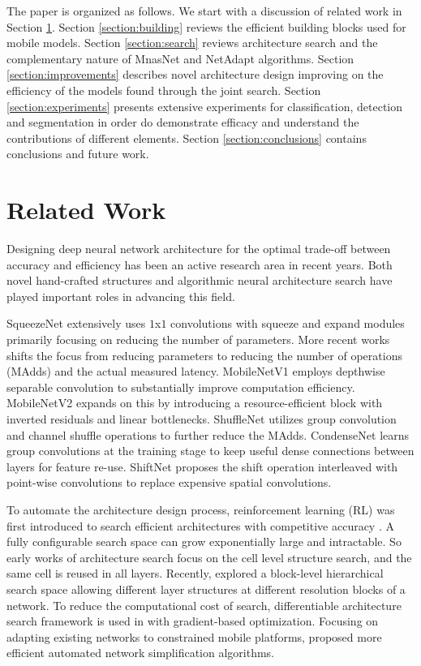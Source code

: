 \documentclass[10pt,twocolumn,letterpaper]{article}
\begin{document}
The paper is organized as follows. We start with a discussion of related work in Section \ref{section:related}. Section \ref{section:building} reviews the efficient building blocks used for mobile models. Section \ref{section:search} reviews architecture search and the complementary nature of MnasNet and NetAdapt algorithms. Section \ref{section:improvements} describes novel architecture design improving on the efficiency of the models found through the joint search. Section \ref{section:experiments} presents extensive experiments for classification, detection and segmentation in order do demonstrate efficacy and understand the contributions of different elements. Section \ref{section:conclusions} contains conclusions and future work.

\section{Related Work}
\label{section:related}
Designing deep neural network architecture for the optimal trade-off between accuracy and efficiency has been an active research area
in recent years. Both novel hand-crafted structures and algorithmic neural architecture search have played important roles in advancing this field.

SqueezeNet\cite{SqueezeNet} extensively uses $1$x$1$ convolutions with squeeze and expand modules primarily focusing on reducing the number of parameters. More recent works shifts the focus from reducing parameters to reducing the number of operations (MAdds) and the actual measured latency. MobileNetV1\cite{MobilenetV1} employs depthwise separable convolution to substantially improve computation efficiency. MobileNetV2\cite{mobilenetv2} expands on this by introducing a resource-efficient block with inverted residuals and linear bottlenecks. ShuffleNet\cite{ShuffleNet2017} utilizes group convolution and channel shuffle operations to further reduce the MAdds. CondenseNet\cite{CondenseNet} learns group convolutions at the training stage to keep useful dense connections between layers for feature re-use. ShiftNet\cite{Shift} proposes the shift operation interleaved with point-wise convolutions to replace expensive spatial convolutions.

To automate the architecture design process, reinforcement learning (RL) was first introduced to search efficient architectures with competitive accuracy \cite{NAS_reinforcement,LearningToLearnScale,BakerGNR16,ProgressiveNAS,ENAS}. A fully configurable search space can grow exponentially large and intractable. So early works of architecture search focus on the cell level structure search, and the same cell is reused in all layers. Recently, \cite{mnasnet} explored a block-level hierarchical search space allowing different layer structures at different resolution blocks of a network. To reduce the computational cost of search, differentiable architecture search framework is used in \cite{DARTS,proxyless,FBnet} with gradient-based optimization. Focusing on adapting existing networks to constrained mobile platforms, \cite{NetAdapt,AMC,ChamNet} proposed more efficient automated network simplification algorithms.
\end{document}
